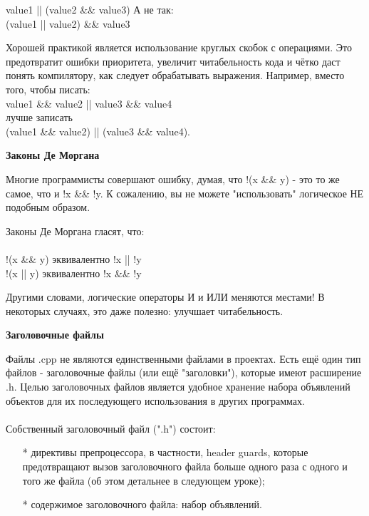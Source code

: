 \documentclass[a4paper,16pt]{report} %
\begin{document}
value1 || (value2 \&\& value3)
А не так:
\\
(value1 || value2) \&\& value3
\\
\begin{sloppypar}
Хорошей практикой является использование круглых скобок с операциями. Это предотвратит ошибки приоритета, увеличит читабельность кода и чётко даст понять компилятору, как следует
обрабатывать выражения. Например, вместо того, чтобы писать:
\\
value1 \&\& value2 || value3 \&\& value4
\\
лучше записать 
\\
(value1 \&\& value2) || (value3 \&\& value4).
\end{sloppypar}
\begin{center}
	\textbf{Законы Де Моргана}
\end{center}
\begin{sloppypar}
Многие программисты совершают ошибку, думая, что !(x \&\& y) - это то
же самое, что и !x \&\& !y. К сожалению, вы не можете "использовать"
логическое НЕ подобным образом.
\end{sloppypar}
Законы Де Моргана гласят, что:
\\ \\
!(x \&\& y) эквивалентно !x || !y
\\
!(x || y) эквивалентно !x \&\& !y
\\
\begin{sloppypar}

Другими словами, логические операторы И и ИЛИ меняются местами! В
некоторых случаях, это даже полезно: улучшает читабельность.
\end{sloppypar}
\begin{center}
\textbf{Заголовочные файлы}
\end{center}
\begin{sloppypar}
Файлы .cpp не являются единственными файлами в проектах. Есть ещё один тип файлов - заголовочные файлы (или ещё "заголовки"), которые имеют расширение .h. Целью заголовочных файлов является удобное хранение набора объявлений объектов для их последующего использования в других программах.
\\ \\
Собственный заголовочный файл (".h") состоит:
\begin{itemize}
\item[*]директивы препроцессора, в частности, header guards, которые предотвращают вызов заголовочного файла больше одного раза с одного и того же файла (об этом детальнее в следующем уроке);
\item[*]содержимое заголовочного файла: набор объявлений.
\end{itemize}
\end{sloppypar}
\end{document}
